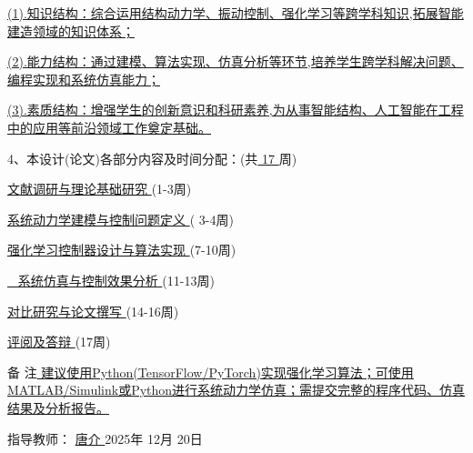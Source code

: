 \documentclass{scrbook}
\begin{document}
\uline{(1).知识结构：综合运用结构动力学、振动控制、强化学习等跨学科知识,拓展智能建造领域的知识体系；                                                    }

\uline{(2).能力结构：通过建模、算法实现、仿真分析等环节,培养学生跨学科解决问题、编程实现和系统仿真能力；                                                  }

\uline{(3).素质结构：增强学生的创新意识和科研素养,为从事智能结构、人工智能在工程中的应用等前沿领域工作奠定基础。                                        }

4、本设计(论文)各部分内容及时间分配：(共\uline{  17  }周)
\begin{description}[评阅及答辩]
\item[第一部分]\uline{   文献调研与理论基础研究                       }(1-3周) 
\item[第二部分]\uline{  系统动力学建模与控制问题定义               }	 ( 3-4周) 
\item[第三部分]\uline{  强化学习控制器设计与算法实现                 }(7-10周)
\item[第四部分]\uline{~ 系统仿真与控制效果分析                     }(11-13周) 
\item[第五部分]\uline{   对比研究与论文撰写                         }(14-16周)
\item[评阅及答辩]\uline{   评阅及答辩 }			              	     (17周)
\end{description}
备    注\uline{   建议使用Python(TensorFlow/PyTorch)实现强化学习算法；可使用MATLAB/Simulink或Python进行系统动力学仿真；需提交完整的程序代码、仿真结果及分析报告。                                                  }

指导教师：	\uline{  唐介  }  	2025年 12月 20日
\end{document}
